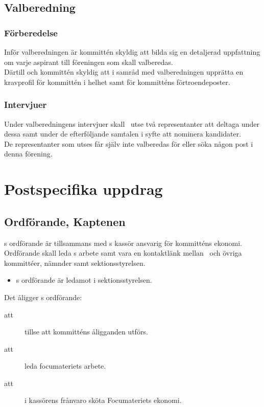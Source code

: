 \subsection{Valberedning}
\subsubsection{Förberedelse}
Inför valberedningen är kommittén skyldig att bilda sig en detaljerad uppfattning om varje aspirant till föreningen som skall valberedas.\\
Därtill och kommittén skyldig att i samråd med valberedningen upprätta en kravprofil för kommittén i helhet samt för kommitténs förtroendeposter.

\subsubsection{Intervjuer}
Under valberedningens intervjuer skall \forening \ utse två representanter att deltaga under dessa samt under de efterföljande samtalen i syfte att nominera kandidater.\\
De representanter som utses får själv inte valberedas för eller söka någon post i denna förening.

\section{Postspecifika uppdrag}

\subsection{Ordförande, Kaptenen}
\forening s ordförande är tillsammans med \forening s kassör ansvarig för kommitténs ekonomi. Ordförande skall leda \forening s arbete samt vara en kontaktlänk mellan \forening \ och övriga kommittéer, nämnder samt sektionsstyrelsen. 

\begin{itemize}
\item \forening s ordförande är ledamot i sektionsstyrelsen.
\end{itemize}

Det åligger \forening s ordförande:
\begin{description}
\item[att] tillse att kommitténs åligganden utförs.
\item[att] leda focumateriets arbete. 
\item[att] i kassörens frånvaro sköta Focumateriets ekonomi. 
\end{description}


